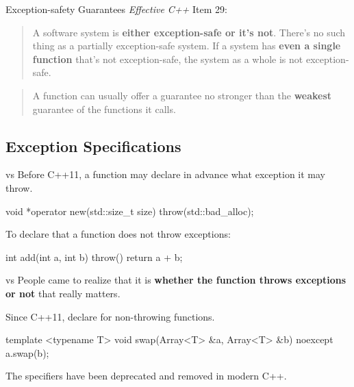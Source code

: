 \documentclass{beamer}
\begin{document}
\begin{frame}{Exception-safety Guarantees}
    \textit{Effective C++} Item 29:
    \begin{quotation}
        A software system is \textbf{either exception-safe or it's not}. There's no such thing as a partially exception-safe system. If a system has \textbf{even a single function} that's not exception-safe, the system as a whole is not exception-safe.
    \end{quotation}
    \pause
    \begin{quotation}
        A function can usually offer a guarantee no stronger than the \textbf{weakest} guarantee of the functions it calls.
    \end{quotation}
\end{frame}

\subsection{Exception Specifications}

\begin{frame}[fragile]{ vs }
    Before C++11, a function may declare in advance what exception it may throw.
    \begin{cpp}
void *operator new(std::size_t size) throw(std::bad_alloc);
    \end{cpp}
    \pause
    To declare that a function does not throw exceptions:
    \begin{cpp}
int add(int a, int b) throw() {
  return a + b;
}
    \end{cpp}
\end{frame}

\begin{frame}[fragile]{ vs }
    People came to realize that it is \textbf{whether the function throws exceptions or not} that really matters.\par
    \pause
    Since C++11, declare  for non-throwing functions.
    \begin{cpp}
template <typename T>
void swap(Array<T> &a, Array<T> &b) noexcept {
  a.swap(b);
}
    \end{cpp}
    \pause
    The  specifiers have been deprecated and removed in modern C++.
\end{frame}
\end{document}
